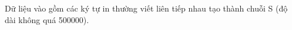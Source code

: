 Dữ liệu vào gồm các ký tự in thường viết liên tiếp nhau tạo thành chuỗi S (độ dài không quá 500000).  

\